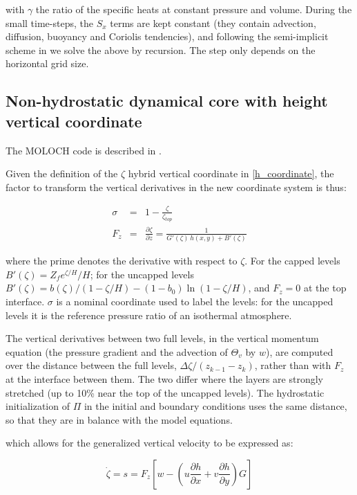 with $\gamma$ the ratio of the specific heats at constant pressure and volume.
During the small time-steps, the $S_x$ terms are kept constant (they contain
advection, diffusion, buoyancy and Coriolis tendencies), and following the
semi-implicit scheme in \cite{Klemp_1978} we solve the above by recursion.
The step only depends on the horizontal grid size.

\subsection{Non-hydrostatic dynamical core with height vertical coordinate}

The MOLOCH code is described in \citep{Malguzzi_11,giorgi:23}.

Given the definition of the $\zeta$ hybrid vertical coordinate in
\ref{h_coordinate}, the factor to transform the vertical derivatives in
the new coordinate system is thus:

\begin{eqnarray}
\sigma &=& 1 - \frac{\zeta}{\zeta_{top}} \\
F_z &=& \frac{\partial \zeta}{\partial z} =
     \frac{1}{G'(\zeta)\, h(x,y) + B'(\zeta)}
\end{eqnarray}

where the prime denotes the derivative with respect to $\zeta$. For the
capped levels $B'(\zeta) = Z_f e^{\zeta/H}/H$; for the uncapped levels
$B'(\zeta) = b(\zeta)/(1 - \zeta/H) - (1 - b_0)\ln(1 - \zeta/H)$, and
$F_z = 0$ at the top interface. $\sigma$ is a nominal coordinate used to
label the levels: for the uncapped levels it is the reference pressure
ratio of an isothermal atmosphere.

The vertical derivatives between two full levels, in the vertical momentum
equation (the pressure gradient and the advection of $\Theta_v$ by $w$),
are computed over the distance between the full levels,
$\Delta\zeta / (z_{k-1} - z_k)$, rather than with $F_z$ at the interface
between them. The two differ where the layers are strongly stretched (up to
10\% near the top of the uncapped levels). The hydrostatic initialization
of $\Pi$ in the initial and boundary conditions uses the same distance, so
that they are in balance with the model equations.

which allows for the generalized vertical velocity to be expressed as:

\begin{equation}
\dot{\zeta} = s = F_z \left[ w - 
              \left( u \frac{\partial h}{\partial x} +
                     v \frac{\partial h}{\partial y} \right) G \right]
\end{equation}


